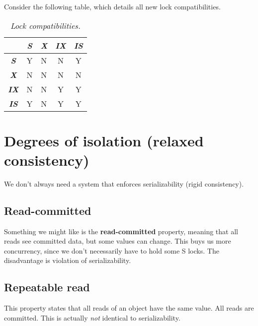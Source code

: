 \documentclass{article}
\begin{document}
Consider the following table, which details all new lock compatibilities.
\begin{table}[]
\centering
\caption{\emph{Lock compatibilities.}}
\vspace{5px}
\label{my-label}
\begin{tabular}{c|c|c|c|c|}
\cline{2-5}
                                           & \textit{\textbf{S}} & \textit{\textbf{X}} & \textit{\textbf{IX}} & \textit{\textbf{IS}} \\ \hline
\multicolumn{1}{|c|}{\textit{\textbf{S}}}  & Y                   & N                   & N                    & Y                    \\ \hline
\multicolumn{1}{|c|}{\textit{\textbf{X}}}  & N                   & N                   & N                    & N                    \\ \hline
\multicolumn{1}{|c|}{\textit{\textbf{IX}}} & N                   & N                   & Y                    & Y                    \\ \hline
\multicolumn{1}{|c|}{\textit{\textbf{IS}}} & Y                   & N                   & Y                    & Y                    \\ \hline
\end{tabular}
\end{table}

\section{Degrees of isolation (relaxed consistency)}

We don't always need a system that enforces serializability (rigid consistency). 

\subsection{Read-committed}

Something we might like is the \textbf{read-committed} property, meaning that all reads see committed data, but some values can change. This buys us more concurrency, since we don't necessarily have to hold some S locks. The disadvantage is violation of serializability.

\subsection{Repeatable read}

This property states that all reads of an object have the same value. All reads are committed. This is actually \emph{not} identical to serializability.
\end{document}
